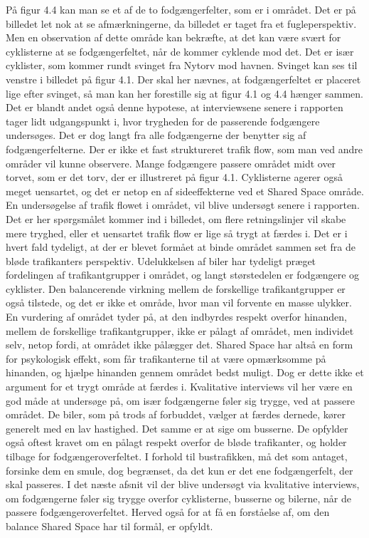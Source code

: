 På figur 4.4 kan man se et af de to fodgængerfelter, som er i området. Det er på billedet let nok at se afmærkningerne, da billedet er taget fra et fugleperspektiv. Men en observation af dette område kan bekræfte, at det kan være svært for cyklisterne at se fodgængerfeltet, når de kommer cyklende mod det. Det er især cyklister, som kommer rundt svinget fra Nytorv mod havnen. Svinget kan ses til venstre i billedet på figur 4.1. Der skal her nævnes, at fodgængerfeltet er placeret lige efter svinget, så man kan her forestille sig at figur 4.1 og 4.4 hænger sammen. Det er blandt andet også denne hypotese, at interviewsene senere i rapporten tager lidt udgangspunkt i, hvor trygheden for de passerende fodgængere undersøges. 
Det er dog langt fra alle fodgængerne der benytter sig af fodgængerfelterne. Der er ikke et fast struktureret trafik flow, som man ved andre områder vil kunne observere. Mange fodgængere passere området midt over torvet, som er det torv, der er illustreret på figur 4.1. Cyklisterne agerer også meget uensartet, og det er netop en af sideeffekterne ved et Shared Space område. En undersøgelse af trafik flowet i området, vil blive undersøgt senere i rapporten. Det er her spørgsmålet kommer ind i billedet, om flere retningslinjer vil skabe mere tryghed, eller et uensartet trafik flow er lige så trygt at færdes i. Det er i hvert fald tydeligt, at der er blevet formået at binde området sammen set fra de bløde trafikanters perspektiv. Udelukkelsen af biler har tydeligt præget fordelingen af trafikantgrupper i området, og langt størstedelen er fodgængere og cyklister. Den balancerende virkning mellem de forskellige trafikantgrupper er også tilstede, og det er ikke et område, hvor man vil forvente en masse ulykker. En vurdering af området tyder på, at den indbyrdes respekt overfor hinanden, mellem de forskellige trafikantgrupper, ikke er pålagt af området, men individet selv, netop fordi, at området ikke pålægger det. Shared Space har altså en form for psykologisk effekt, som får trafikanterne til at være opmærksomme på hinanden, og hjælpe hinanden gennem området bedst muligt. Dog er dette ikke et argument for et trygt område at færdes i. Kvalitative interviews vil her være en god måde at undersøge på, om især fodgængerne føler sig trygge, ved at passere området.
De biler, som på trods af forbuddet, vælger at færdes dernede, kører generelt med en lav hastighed. Det samme er at sige om busserne. De opfylder også oftest kravet om en pålagt respekt overfor de bløde trafikanter, og holder tilbage for fodgængeroverfeltet. I forhold til bustrafikken, må det som antaget, forsinke dem en smule, dog begrænset, da det kun er det ene fodgængerfelt, der skal passeres. 
I det næste afsnit vil der blive undersøgt via kvalitative interviews, om fodgængerne føler sig trygge overfor cyklisterne, busserne og bilerne, når de passere fodgængeroverfeltet. Herved også for at få en forståelse af, om den balance Shared Space har til formål, er opfyldt.
